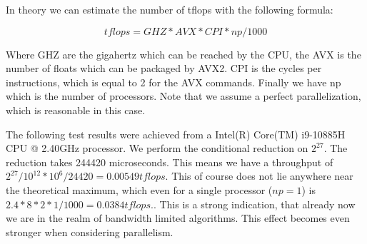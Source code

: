 \documentclass[]{article}
\begin{document}
In theory we can estimate the number of tflops with the following formula:

\begin{center}
	\begin{equation}
		tflops = GHZ * AVX * CPI * np / 1000
	\end{equation}
\end{center}

Where GHZ are the gigahertz which can be reached by the CPU, the AVX is the number of floats which can be packaged by AVX2. CPI is the cycles per instructions, which is equal to 2 for the AVX commands. Finally we have np which is the number of processors. Note that we assume a perfect parallelization, which is reasonable in this case.

The following test results were achieved from a Intel(R) Core(TM) i9-10885H CPU @ 2.40GHz
processor. We perform the conditional reduction on  $2^{27}$. The reduction takes 244420 microseconds. This means we have a throughput of $2^{27} / 10^{12} * 10^6 / 24420 = 0.00549 tflops$. This of course does not lie anywhere near the theoretical maximum, which even for a single processor ($np = 1$) is $2.4 * 8 * 2 * 1 / 1000 = 0.0384 tflops.$. This is a strong indication, that already now we are in the realm of bandwidth limited algorithms. This effect becomes even stronger when considering parallelism. 


	
\def\N{1}
\def\Bytes{12}
\def\s{12}
\def\d{8096}
\def\p{32}
\end{document}
